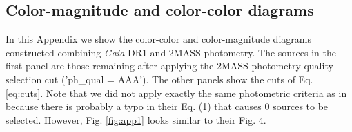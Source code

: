 \documentclass[onecolumn]{aa} %
\begin{document}




\begin{appendix}
\section{Color-magnitude and color-color diagrams}
In this Appendix we show the color-color and color-magnitude diagrams constructed combining \textit{Gaia} DR1 and 2MASS photometry. The sources in the first panel  are those remaining after applying the 2MASS photometry quality selection cut ('ph\_qual = AAA'). The other panels show the cuts of Eq. \eqref{eq:cuts}. Note that we did not apply exactly the same photometric criteria as in \cite{Alves2012} because there is probably a typo in their Eq. (1) that causes 0 sources to be selected. However, Fig. \ref{fig:app1} looks similar to their Fig. 4.


\end{appendix}
\end{document}
